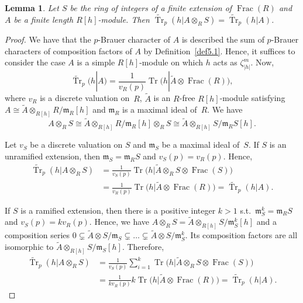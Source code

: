 \documentclass[11pt]{article}
\numberwithin{equation}{section}
\numberwithin{equation}{section}
\newtheorem{Lemma}[Theorem]{Lemma}
\begin{document}
\begin{Lemma}\label{tensorBch}
Let $S$ be the ring of integers of a finite extension of $\operatorname{Frac}(R)$ and $A$ be a finite length $R[h]$-module. Then $\widetilde{\operatorname{Tr}}_p(h|A\otimes_{R}S)=\widetilde{\operatorname{Tr}}_p(h|A)$.
\end{Lemma}

\begin{proof}
We have that the $p$-Brauer character of $A$ is described the sum of $p$-Brauer characters of composition factors of $A$ by Definition~\ref{def5.1}. Hence, it suffices to consider the case $A$ is a simple $R[h]$-module on which $h$ acts as $\zeta_{|h|}^m$. Now,
\[
\widetilde{\operatorname{Tr}}_p(h|A)=\frac{1}{v_R(p)}\operatorname{Tr} \big(h|\widetilde{A}\otimes \operatorname{Frac}(R)\big),
\]
where $v_R$ is a discrete valuation on~$R$, $\widetilde{A}$ is an $R$-free $R[h]$-module satisfying $A\cong \widetilde{A}\otimes_{R[h]} R/\mathfrak{m}_R[h]$ and $\mathfrak{m}_R$ is a maximal ideal of~$R$. We have
\[
A\otimes_R S\cong \widetilde{A}\otimes_{R[h]} R/\mathfrak{m}_R[h]\otimes_R S\cong \widetilde{A}\otimes_{R[h]} S/\mathfrak{m}_RS[h].
\]

 Let $v_S$ be a discrete valuation on $S$ and $\mathfrak{m}_S$ be a maximal ideal of~$S$. If $S$ is an unramified extension, then $\mathfrak{m}_S=\mathfrak{m}_RS$ and $v_S(p)=v_R(p)$. Hence,
 \begin{align*}
\widetilde{\operatorname{Tr}}_p(h|A\otimes_R S) &=\frac{1}{v_S(p)}\operatorname{Tr}\big(h|\widetilde{A}\otimes_R S\otimes \operatorname{Frac}(S)\big)\\
& =\frac{1}{v_R(p)}\operatorname{Tr}\big(h|\widetilde{A}\otimes \operatorname{Frac}(R)\big)=\widetilde{\operatorname{Tr}}_p(h|A).
 \end{align*}

 If $S$ is a ramified extension, then there is a positive integer $k>1$ s.t.\ $\mathfrak{m}_S^k=\mathfrak{m}_RS$ and $v_S(p)=kv_R(p)$. Hence, we have $A\otimes_R S=\widetilde{A}\otimes_{R[h]}S/\mathfrak{m}_S^k[h]$ and a composition series $0\subsetneq \widetilde{A}\otimes S/\mathfrak{m}_S\subsetneq \dots \subsetneq \widetilde{A}\otimes S/\mathfrak{m}_S^k$. Its composition factors are all isomorphic to $\widetilde{A}\otimes_{R[h]} S/\mathfrak{m}_S[h]$. Therefore,
\begin{align*}
\widetilde{\operatorname{Tr}}_p(h|A\otimes_R S) & =\frac{1}{v_S(p)}\sum_{i=1}^k\operatorname{Tr} \big(h|\widetilde{A}\otimes_R S\otimes \operatorname{Frac}(S)\big)\\
& =\frac{1}{kv_R(p)}k\operatorname{Tr}\big(h|\widetilde{A}\otimes \operatorname{Frac}(R)\big) =\widetilde{\operatorname{Tr}}_p(h|A).\tag*{\qed}
\end{align*}\renewcommand{\qed}{}
\end{proof}
\end{document}
